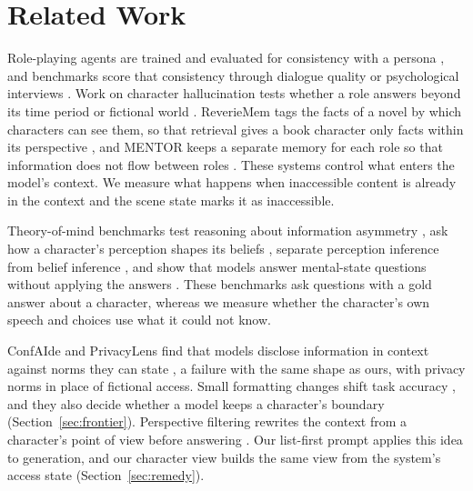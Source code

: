 \section{Related Work}
Role-playing agents are trained and evaluated for consistency with a persona \citep{shao-etal-2023-character,wang-etal-2024-rolellm}, and benchmarks score that consistency through dialogue quality or psychological interviews \citep{tu-etal-2024-charactereval,wang-etal-2024-incharacter}. Work on character hallucination tests whether a role answers beyond its time period or fictional world \citep{ahn-etal-2024-timechara,han2026charm}. ReverieMem tags the facts of a novel by which characters can see them, so that retrieval gives a book character only facts within its perspective \citep{tang2026staying}, and MENTOR keeps a separate memory for each role so that information does not flow between roles \citep{zhu2026mentor}. These systems control what enters the model's context. We measure what happens when inaccessible content is already in the context and the scene state marks it as inaccessible.

Theory-of-mind benchmarks test reasoning about information asymmetry \citep{kim-etal-2023-fantom}, ask how a character's perception shapes its beliefs \citep{gandhi2023bigtom,xu-etal-2024-opentom}, separate perception inference from belief inference \citep{jung-etal-2024-perceptions}, and show that models answer mental-state questions without applying the answers \citep{gu2026simpletom}. These benchmarks ask questions with a gold answer about a character, whereas we measure whether the character's own speech and choices use what it could not know.

ConfAIde and PrivacyLens find that models disclose information in context against norms they can state \citep{mireshghallah2024confaide,shao2024privacylens}, a failure with the same shape as ours, with privacy norms in place of fictional access. Small formatting changes shift task accuracy \citep{sclar2024quantifying}, and they also decide whether a model keeps a character's boundary (Section~\ref{sec:frontier}). Perspective filtering rewrites the context from a character's point of view before answering \citep{wilf-etal-2024-think}. Our list-first prompt applies this idea to generation, and our character view builds the same view from the system's access state (Section~\ref{sec:remedy}).

